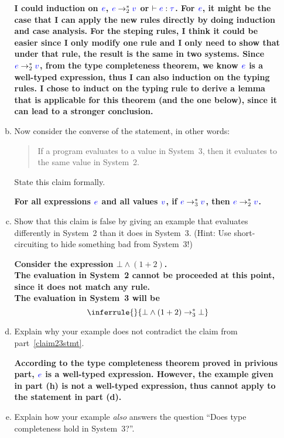 \documentclass{article}
\newcommand{\meta}[1]{{\color{blue}#1}}
\begin{document}
\begin{enumerate}[leftmargin=*,itemindent=*,start=6,label={{\bf Problem \arabic*}.},ref=\arabic*]
\begin{enumerate}[(a)]
    \textbf{I could induction on $\meta{e}$, $\meta{e} \to_2^* \meta{v}$ or $\vdash \meta{e} : \meta{\tau}$. For $\meta{e}$, it might be the case that I can apply the new rules directly by doing induction and case analysis. For the steping rules, I think it could be easier since I only modify one rule and I only need to show that under that rule, the result is the same in two systems. Since $\meta{e} \to_2^* \meta{v}$, from the type completeness theorem, we know $\meta{e}$ is a well-typed expression, thus I can also induction on the typing rules. I chose to induct on the typing rule to derive a lemma that is applicable for this theorem (and the one below), since it can lead to a stronger conclusion.
    } 

  \item\label{claim32stmt} Now consider the converse of the statement, in other words:
    \begin{quote}
      If a program evaluates to a value in System~3, then it evaluates to the same value in System~2.
    \end{quote}
    State this claim formally.

    \textbf {
      For all expressions $\meta{e}$ and all values $\meta{v}$, if $\meta{e} \to_3^* \meta{v}$, then $\meta{e} \to_2^* \meta{v}$.
    }
  \item Show that this claim is false by giving an example that evaluates differently in System~2 than
    it does in System~3. (Hint: Use short-circuiting to hide something bad from System~3!)

    \textbf {
      Consider the expression $\bot \wedge (1 + 2)$. \\
      The evaluation in System~2 cannot be proceeded at this point, since it does not match any rule. \\
      The evaluation in System~3 will be $$
        \inferrule{ }{\bot \wedge (1 + 2) \to_3^* \bot}$$
    }


  \item Explain why your example does not contradict the claim from part~\ref{claim23stmt}.
  
    \textbf {
      According to the type completeness theorem proved in privious part, $\meta{e}$ is a well-typed expression. However, the example given in part (h) is not a well-typed expression, thus cannot apply to the statement in part (d).
    }

  \item Explain how your example \emph{also} answers the question ``Does type completeness hold in System~3?''.
    

\end{enumerate}
\end{enumerate}
\end{document}
